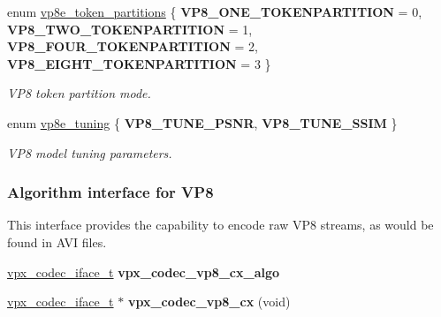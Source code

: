 \begin{DoxyCompactItemize}
enum \hyperlink{group__vp8__encoder_ga5f7508ba3fb453b47f62313ed0b864d2}{vp8e\-\_\-token\-\_\-partitions} \{ {\bfseries \-V\-P8\-\_\-\-O\-N\-E\-\_\-\-T\-O\-K\-E\-N\-P\-A\-R\-T\-I\-T\-I\-O\-N} =  0, 
{\bfseries \-V\-P8\-\_\-\-T\-W\-O\-\_\-\-T\-O\-K\-E\-N\-P\-A\-R\-T\-I\-T\-I\-O\-N} =  1, 
{\bfseries \-V\-P8\-\_\-\-F\-O\-U\-R\-\_\-\-T\-O\-K\-E\-N\-P\-A\-R\-T\-I\-T\-I\-O\-N} =  2, 
{\bfseries \-V\-P8\-\_\-\-E\-I\-G\-H\-T\-\_\-\-T\-O\-K\-E\-N\-P\-A\-R\-T\-I\-T\-I\-O\-N} =  3
 \}
\begin{DoxyCompactList}\small\item\em \-V\-P8 token partition mode. \end{DoxyCompactList}\item 
enum \hyperlink{group__vp8__encoder_ga371dbc29054b3d46364af996ad42ab94}{vp8e\-\_\-tuning} \{ {\bfseries \-V\-P8\-\_\-\-T\-U\-N\-E\-\_\-\-P\-S\-N\-R}, 
{\bfseries \-V\-P8\-\_\-\-T\-U\-N\-E\-\_\-\-S\-S\-I\-M}
 \}
\begin{DoxyCompactList}\small\item\em \-V\-P8 model tuning parameters. \end{DoxyCompactList}\end{DoxyCompactItemize}
\subsubsection*{\-Algorithm interface for \-V\-P8}
\label{_amgrp0b829b38ff2e659173b35cd78e0735bd}%
 \-This interface provides the capability to encode raw \-V\-P8 streams, as would be found in \-A\-V\-I files. \begin{DoxyCompactItemize}
\item 
\hypertarget{group__vp8__encoder_ga689ede372ab835c8e1c9631f17b47eb5}{
\hyperlink{group__codec_gad654f3da60151f5dfef70aca00ef1e9e}{vpx\-\_\-codec\-\_\-iface\-\_\-t} {\bfseries vpx\-\_\-codec\-\_\-vp8\-\_\-cx\-\_\-algo}}
\label{group__vp8__encoder_ga689ede372ab835c8e1c9631f17b47eb5}

\item 
\hypertarget{group__vp8__encoder_ga1b5362d0d5b5a2d50f173f9c160fad9f}{
\hyperlink{group__codec_gad654f3da60151f5dfef70aca00ef1e9e}{vpx\-\_\-codec\-\_\-iface\-\_\-t} $\ast$ {\bfseries vpx\-\_\-codec\-\_\-vp8\-\_\-cx} (void)}
\label{group__vp8__encoder_ga1b5362d0d5b5a2d50f173f9c160fad9f}

\end{DoxyCompactItemize}


